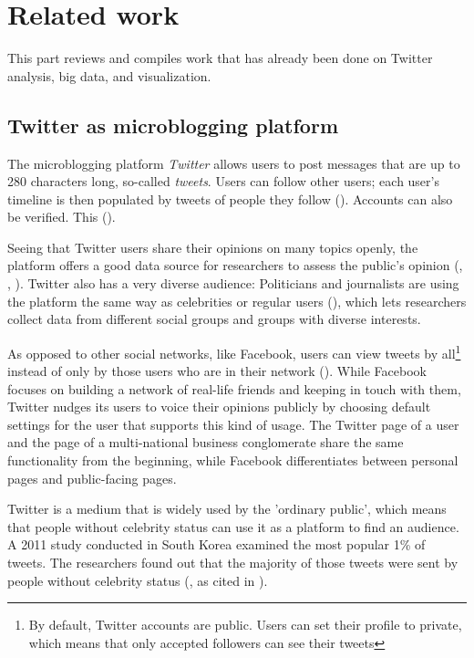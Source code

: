 \section{Related work}
This part reviews and compiles work that has already been done on Twitter analysis, big data, and visualization.

\subsection{Twitter as microblogging platform}
The microblogging platform \emph{Twitter} allows users to post messages that are up to 280 characters long, so-called \emph{tweets}. Users can follow other users; each user's timeline is then populated by tweets of people they follow (\cite{thimmTwitterAlsWahlkampfmedium2012}). Accounts can also be verified. This  (\cite{twitterinc.VerifiedAccounts}).

Seeing that Twitter users share their opinions on many topics openly, the platform offers a good data source for researchers to assess the public's opinion (\cite{pak2010twitter}, \cite{pfaffenberger2016twitter}, \cite{broniatowski2014twitter}). Twitter also has a very diverse audience: Politicians and journalists are using the platform the same way as celebrities or regular users (\cite{pak2010twitter}), which lets researchers collect data from different social groups and groups with diverse interests.

As opposed to other social networks, like Facebook, users can view tweets by all\footnote{By default, Twitter accounts are public. Users can set their profile to private, which means that only accepted followers can see their tweets} instead of only by those users who are in their network (\cite{parkDoesTwitterMotivate2013}). While Facebook focuses on building a network of real-life friends and keeping in touch with them, Twitter nudges its users to voice their opinions publicly by choosing default settings for the user that supports this kind of usage. The Twitter page of a user and the page of a multi-national business conglomerate share the same functionality from the beginning, while Facebook differentiates between personal pages and public-facing pages.

Twitter is a medium that is widely used by the 'ordinary public', which means that people without celebrity status can use it as a platform to find an audience. A 2011 study conducted in South Korea examined the most popular 1\% of tweets. The researchers found out that the majority of those tweets were sent by people without celebrity status (\cite{chang2011structure}, as cited in \cite{parkDoesTwitterMotivate2013}).

